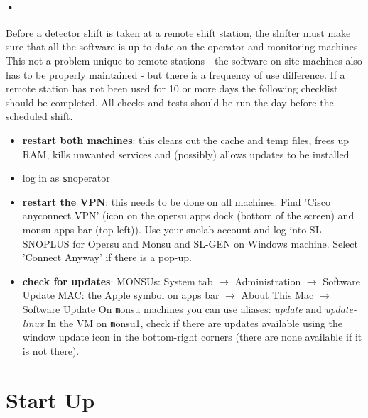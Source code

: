 \documentclass[12pt, oneside, a4paper]{article}
\begin{document}
\paragraph{•}
Before a detector shift is taken at a remote shift station, the shifter must make sure that all the software is up to date on the operator and monitoring machines. This not a problem unique to remote stations - the software on site machines also has to be properly maintained - but there is a frequency of use difference. If a remote station has not been used for 10 or more days the following checklist should be completed. All checks and tests should be run the day before the scheduled shift.
\begin{itemize}
	\item \textbf{restart both machines}: this clears out the cache and temp files, frees up RAM, kills unwanted services and (possibly) allows updates to be installed
	\item log in as {\texttt snoperator}
	\item \textbf{restart the VPN}: this needs to be done on all machines. Find 'Cisco anyconnect VPN' (icon on the opersu apps dock (bottom of the screen) and monsu apps bar (top left)). Use your snolab account and log into SL-SNOPLUS for Opersu and Monsu and SL-GEN on Windows machine. Select 'Connect Anyway' if there is a pop-up.
	\item \textbf{check for updates}: \newline 
	MONSUs: System tab $\rightarrow$ Administration $\rightarrow$ Software Update \newline 
	MAC: the Apple symbol on apps bar $\rightarrow$ About This Mac $\rightarrow$ Software Update \newline 
	On {\texttt monsu} machines you can use aliases: \textit{update} and \textit{update-linux} \newline
      In the VM on {\texttt monsu1}, check if there are updates available using the window update icon in the bottom-right corners (there are none available if it is not there).
\end{itemize}

\section{Start Up}
\end{document}
